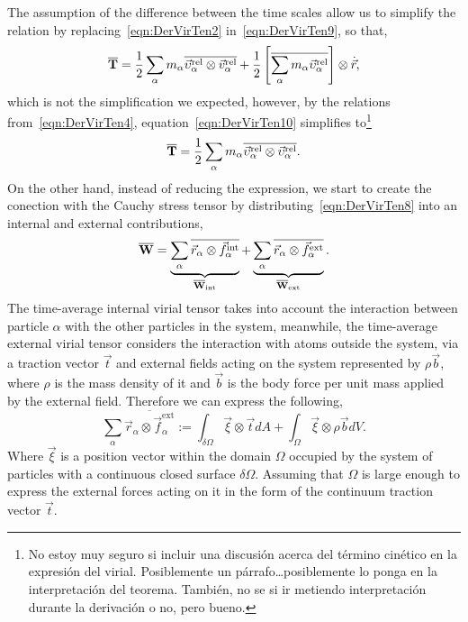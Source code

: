 \documentclass[../../main-notes.tex]{subfiles}
\begin{document}
The assumption of the difference between the time scales allow us to simplify the relation by replacing~\eqref{eqn:DerVirTen2} in~\eqref{eqn:DerVirTen9}, so that,
\begin{equation}
    \overline{\bold{T}}=
        \frac{1}{2}\sum_\alpha m_\alpha\overline{\vec{\upsilon}_\alpha^{\mathrm{rel}}\otimes\vec{v}_\alpha^{\mathrm{rel}}}
        +
        \frac{1}{2} \left[\overline{\sum_\alpha m_\alpha\vec{\upsilon}_\alpha^{\mathrm{rel}}}\right]\otimes\dot{\vec{r}}\label{eqn:DerVirTen10},
\end{equation}
which is not the simplification we expected, however, by the relations from~\eqref{eqn:DerVirTen4}, equation~\eqref{eqn:DerVirTen10} simplifies to\footnote{No estoy muy seguro si incluir una discusión acerca del término cinético en la expresión del virial. Posiblemente un párrafo\dots posiblemente lo ponga en la interpretación del teorema.
También, no se si ir metiendo interpretación durante la derivación o no, pero bueno.}
\begin{equation}
    \overline{\bold{T}}=
        \frac{1}{2}\sum_\alpha m_\alpha\overline{\vec{\upsilon}_\alpha^{\mathrm{rel}}\otimes\vec{\upsilon}_\alpha^{\mathrm{rel}}}\label{eqn:DerVirTen11}.
\end{equation}
On the other hand, instead of reducing the expression, we start to create the conection with the Cauchy stress tensor by distributing~\eqref{eqn:DerVirTen8} into an internal and external contributions,
\begin{equation}
    \overline{\bold{W}} = 
    \underbrace{\sum_\alpha\overline{\vec{r}_\alpha\otimes\vec{f}_\alpha^{\mathrm{int}}}}_{\overline{\bold{W}}_{\mathrm{int}}}
        +
        \underbrace{\sum_\alpha\overline{\vec{r}_\alpha\otimes\vec{f}_\alpha^{\mathrm{ext}}}}_{\overline{\bold{W}}_{\mathrm{ext}}}.\label{eqn:DerVirTen12}
\end{equation}
The time-average internal virial tensor takes into account the interaction between particle $\alpha$ with the other particles in the system, meanwhile, the time-average external virial tensor considers the interaction with atoms outside the system, via a traction vector $\vec{t}$ and external fields acting on the system represented by $\rho\vec{b}$, where $\rho$ is the mass density of it and $\vec{b}$ is the body force per unit mass applied by the external field.
Therefore we can express the following,
\begin{equation}
    \sum_\alpha\overline{\vec{r}_\alpha\otimes\vec{f}_\alpha^{\mathrm{ext}}}
    :=
    \int_{\delta\Omega}\vec{\xi}\otimes\vec{t}dA 
    +
    \int_{\Omega}\vec{\xi}\otimes\rho\vec{b}dV.\label{eqn:DerVirTen13}
\end{equation}
Where $\vec{\xi}$ is a position vector within the domain $\Omega$ occupied by the system of particles with a continuous closed surface $\delta\Omega$.
Assuming that $\Omega$ is large enough to express the external forces acting on it in the form of the continuum traction vector $\vec{t}$.
\end{document}
